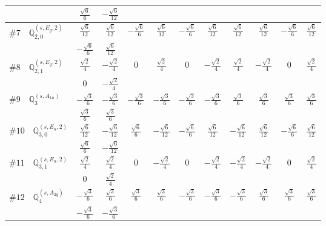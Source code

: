 \documentclass[fleqn,9pt,landscape]{jsarticle}
\begin{document}
\begin{center}
\begin{longtable}{lcccccccccc}
& $ \frac{\sqrt{6}}{6} $ & $ - \frac{\sqrt{6}}{12} $ & $  $ & $  $ & $  $ & $  $ & $  $ & $  $ & $  $ & $  $ \\ \hline
$ \#7\quad \mathbb{Q}_{2,0}^{(s,E_{g},2)} $ & $ \frac{\sqrt{6}}{12} $ & $ \frac{\sqrt{6}}{12} $ & $ - \frac{\sqrt{6}}{6} $ & $ \frac{\sqrt{6}}{12} $ & $ - \frac{\sqrt{6}}{6} $ & $ \frac{\sqrt{6}}{12} $ & $ \frac{\sqrt{6}}{12} $ & $ \frac{\sqrt{6}}{12} $ & $ - \frac{\sqrt{6}}{6} $ & $ \frac{\sqrt{6}}{12} $ \\
& $ - \frac{\sqrt{6}}{6} $ & $ \frac{\sqrt{6}}{12} $ & $  $ & $  $ & $  $ & $  $ & $  $ & $  $ & $  $ & $  $ \\ \hline
$ \#8\quad \mathbb{Q}_{2,1}^{(s,E_{g},2)} $ & $ \frac{\sqrt{2}}{4} $ & $ - \frac{\sqrt{2}}{4} $ & $ 0 $ & $ \frac{\sqrt{2}}{4} $ & $ 0 $ & $ - \frac{\sqrt{2}}{4} $ & $ \frac{\sqrt{2}}{4} $ & $ - \frac{\sqrt{2}}{4} $ & $ 0 $ & $ \frac{\sqrt{2}}{4} $ \\
& $ 0 $ & $ - \frac{\sqrt{2}}{4} $ & $  $ & $  $ & $  $ & $  $ & $  $ & $  $ & $  $ & $  $ \\ \hline
$ \#9\quad \mathbb{Q}_{3}^{(s,A_{1u})} $ & $ - \frac{\sqrt{3}}{6} $ & $ - \frac{\sqrt{3}}{6} $ & $ - \frac{\sqrt{3}}{6} $ & $ - \frac{\sqrt{3}}{6} $ & $ - \frac{\sqrt{3}}{6} $ & $ - \frac{\sqrt{3}}{6} $ & $ \frac{\sqrt{3}}{6} $ & $ \frac{\sqrt{3}}{6} $ & $ \frac{\sqrt{3}}{6} $ & $ \frac{\sqrt{3}}{6} $ \\
& $ \frac{\sqrt{3}}{6} $ & $ \frac{\sqrt{3}}{6} $ & $  $ & $  $ & $  $ & $  $ & $  $ & $  $ & $  $ & $  $ \\ \hline
$ \#10\quad \mathbb{Q}_{3,0}^{(s,E_{u},2)} $ & $ \frac{\sqrt{6}}{12} $ & $ - \frac{\sqrt{6}}{12} $ & $ \frac{\sqrt{6}}{6} $ & $ - \frac{\sqrt{6}}{12} $ & $ - \frac{\sqrt{6}}{6} $ & $ \frac{\sqrt{6}}{12} $ & $ - \frac{\sqrt{6}}{12} $ & $ \frac{\sqrt{6}}{12} $ & $ - \frac{\sqrt{6}}{6} $ & $ \frac{\sqrt{6}}{12} $ \\
& $ \frac{\sqrt{6}}{6} $ & $ - \frac{\sqrt{6}}{12} $ & $  $ & $  $ & $  $ & $  $ & $  $ & $  $ & $  $ & $  $ \\ \hline
$ \#11\quad \mathbb{Q}_{3,1}^{(s,E_{u},2)} $ & $ \frac{\sqrt{2}}{4} $ & $ \frac{\sqrt{2}}{4} $ & $ 0 $ & $ - \frac{\sqrt{2}}{4} $ & $ 0 $ & $ - \frac{\sqrt{2}}{4} $ & $ - \frac{\sqrt{2}}{4} $ & $ - \frac{\sqrt{2}}{4} $ & $ 0 $ & $ \frac{\sqrt{2}}{4} $ \\
& $ 0 $ & $ \frac{\sqrt{2}}{4} $ & $  $ & $  $ & $  $ & $  $ & $  $ & $  $ & $  $ & $  $ \\ \hline
$ \#12\quad \mathbb{Q}_{4}^{(s,A_{2g})} $ & $ - \frac{\sqrt{3}}{6} $ & $ \frac{\sqrt{3}}{6} $ & $ \frac{\sqrt{3}}{6} $ & $ \frac{\sqrt{3}}{6} $ & $ - \frac{\sqrt{3}}{6} $ & $ - \frac{\sqrt{3}}{6} $ & $ - \frac{\sqrt{3}}{6} $ & $ \frac{\sqrt{3}}{6} $ & $ \frac{\sqrt{3}}{6} $ & $ \frac{\sqrt{3}}{6} $ \\
& $ - \frac{\sqrt{3}}{6} $ & $ - \frac{\sqrt{3}}{6} $ & $  $ & $  $ & $  $ & $  $ & $  $ & $  $ & $  $ & $  $ \\
\end{longtable}
\end{center}
\end{document}
